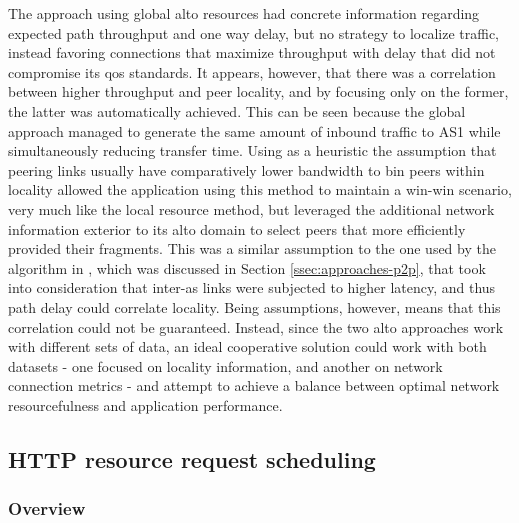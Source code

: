     The approach using global \gls{alto} resources had concrete information regarding expected path throughput and one way delay, but no strategy to localize traffic, instead favoring connections that maximize throughput with delay that did not compromise its \gls{qos} standards.
    It appears, however, that there was a correlation between higher throughput and peer locality, and by focusing only on the former, the latter was automatically achieved. 
    This can be seen because the global approach managed to generate the same amount of inbound traffic to AS1 while simultaneously reducing transfer time.
    Using as a heuristic the assumption that peering links usually have comparatively lower bandwidth to bin peers within locality allowed the application using this method to maintain a win-win scenario, very much like the local resource method, but leveraged the additional network information exterior to its \gls{alto} domain to select peers that more efficiently provided their fragments.
    This was a similar assumption to the one used by the algorithm in \cite{qin2009}, which was discussed in Section \ref{ssec:approaches-p2p}, that took into consideration that inter-\gls{as} links were subjected to higher latency, and thus path delay could correlate locality.
    Being assumptions, however, means that this correlation could not be guaranteed. 
    Instead, since the two \gls{alto} approaches work with different sets of data, an ideal cooperative solution could work with both datasets - one focused on locality information, and another on network connection metrics - and attempt to achieve a balance between optimal network resourcefulness and application performance.

\subsection{HTTP resource request scheduling}

\label{ssec:scenario2}

\subsubsection{Overview}

